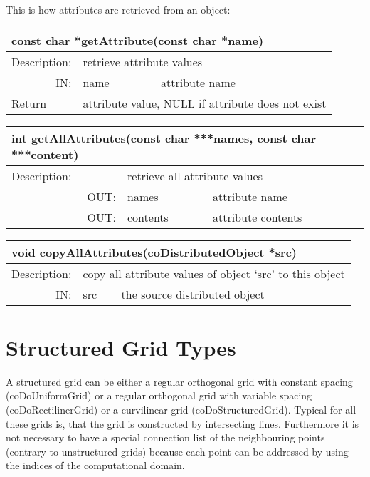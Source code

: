 This is how attributes are retrieved from an object:


\begin{longtable}{|p{4cm}|p{2.5cm}|p{7cm}|}
\hline
\multicolumn{3}{|p{13.5cm}|}{\bf const char *getAttribute(const char *name)} \\
\hline
{Description:}  
           & \multicolumn{2}{p{9.5cm}|}{retrieve attribute values} \\
\hline
\multicolumn{1}{|r|}{IN:} & {name} 
                          & {attribute name}\\
\hline
{Return}  
  & \multicolumn{2}{p{9.5cm}|}{attribute value, NULL if attribute does not exist} \endhead
\hline
\end{longtable}

\begin{longtable}{|p{4cm}|p{2.5cm}|p{7cm}|}
\hline
\multicolumn{3}{|p{13.5cm}|}{\bf int getAllAttributes(const char ***names, 
const char ***content)}\\
\hline
{Description:}  
           & \multicolumn{2}{p{9.5cm}|}{retrieve all attribute values} \\
\hline
\multicolumn{1}{|r|}{OUT:} & {names} 
                          & {attribute name}\\
\hline
\multicolumn{1}{|r|}{OUT:} & {contents} 
                          & {attribute contents}\endhead
\hline
\end{longtable}

\begin{longtable}{|p{4cm}|p{2.5cm}|p{7cm}|}
\hline
\multicolumn{3}{|p{13.5cm}|}{\bf void copyAllAttributes(coDistributedObject  *src)} \\
\hline
{Description:}  
      & \multicolumn{2}{p{9.5cm}|}{copy all attribute values of object `src' to this object} \\
\hline
\multicolumn{1}{|r|}{IN:} & {src} 
                          & {the source distributed object}\endhead
\hline
\end{longtable}

 

\section{Structured Grid Types}

A structured grid can be either a regular orthogonal grid with constant spacing 
(coDoUniformGrid) or a regular orthogonal grid with variable spacing
(coDoRectilinerGrid) or a curvilinear grid (coDoStructuredGrid). Typical for all 
these grids is, that the grid is constructed by intersecting lines.
Furthermore it is not necessary to have a special connection list of the 
neighbouring points (contrary to unstructured grids) because each point can be
addressed by using the indices of  the computational domain.


